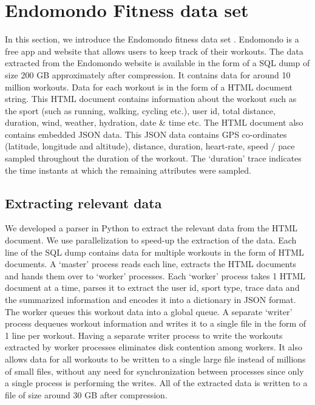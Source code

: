 \documentclass{acm_proc_article-sp}
\begin{document}
\section{Endomondo Fitness data set}
\label{expAnalysis}
In this section, we introduce the Endomondo fitness data set \cite{endomondo}. Endomondo \cite{endomondo} is a free app and website that allows users to keep track of their workouts. The data extracted from the Endomondo website \cite{endomondo} is available in the form of a SQL dump of size 200 GB approximately after compression. It contains data for around 10 million workouts. Data for each workout is in the form of a HTML document string. This HTML document contains information about the workout such as the sport (such as running, walking, cycling etc.), user id, total distance, duration, wind, weather, hydration, date \& time etc. The HTML document also contains embedded JSON data. This JSON data contains GPS co-ordinates (latitude, longitude and altitude), distance, duration, heart-rate, speed / pace sampled throughout the duration of the workout. The `duration' trace indicates the time instants at which the remaining attributes were sampled.

\subsection{Extracting relevant data}
We developed a parser in Python to extract the relevant data from the HTML document. We use parallelization to speed-up the extraction of the data. Each line of the SQL dump contains data for multiple workouts in the form of HTML documents. A `master' process reads each line, extracts the HTML documents and hands them over to `worker' processes. Each `worker' process takes 1 HTML document at a time, parses it to extract the user id, sport type, trace data and the summarized information and encodes it into a dictionary in JSON format. The worker queues this workout data into a global queue. A separate `writer' process dequeues workout information and writes it to a single file in the form of 1 line per workout. Having a separate writer process to write the workouts extracted by worker processes eliminates disk contention among workers. It also allows data for all workouts to be written to a single large file instead of millions of small files, without any need for synchronization between processes since only a single process is performing the writes. All of the extracted data is written to a file of size around 30 GB after compression.
\end{document}
